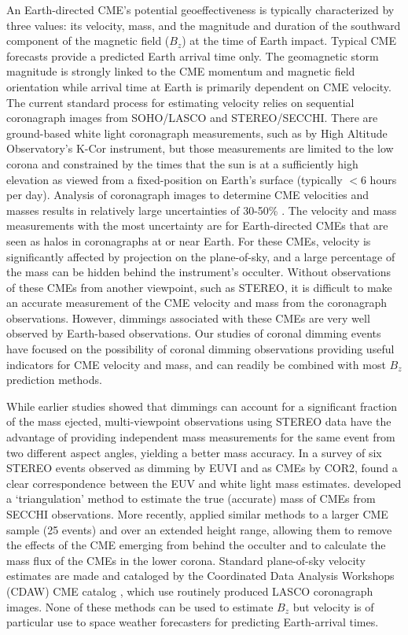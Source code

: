 An Earth-directed CME’s potential geoeffectiveness is typically characterized by three values: its velocity, mass, and the magnitude and duration of the southward component of the magnetic field ($B_z$) at the time of Earth impact. Typical CME forecasts provide a predicted Earth arrival time only. The geomagnetic storm magnitude is strongly linked to the CME momentum and magnetic field orientation while arrival time at Earth is primarily dependent on CME velocity. The current standard process for estimating velocity relies on sequential coronagraph images from SOHO/LASCO and STEREO/SECCHI. There are ground-based white light coronagraph measurements, such as by High Altitude Observatory’s K-Cor instrument, but those measurements are limited to the low corona and constrained by the times that the sun is at a sufficiently high elevation as viewed from a fixed-position on Earth's surface (typically $<$6 hours per day). Analysis of coronagraph images to determine CME velocities and masses results in relatively large uncertainties of 30-50\% \citep{Vourlidas2000, Vourlidas2010, Vourlidas2011}. The velocity and mass measurements with the most uncertainty are for Earth-directed CMEs that are seen as halos in coronagraphs at or near Earth. For these CMEs, velocity is significantly affected by projection on the plane-of-sky, and a large percentage of the mass can be hidden behind the instrument’s occulter. Without observations of these CMEs from another viewpoint, such as STEREO, it is difficult to make an accurate measurement of the CME velocity and mass from the coronagraph observations. However, dimmings associated with these CMEs are very well observed by Earth-based observations. Our studies of coronal dimming events have focused on the possibility of coronal dimming observations providing useful indicators for CME velocity and mass, and can readily be combined with most $B_z$ prediction methods.

While earlier studies showed that dimmings can account for a significant fraction of the mass ejected, multi-viewpoint observations using STEREO data have the advantage of providing independent mass measurements for the same event from two different aspect angles, yielding a better mass accuracy. In a survey of six STEREO events observed as dimming by EUVI and as CMEs by COR2, \citet{Aschwanden2009} found a clear correspondence between the EUV and white light mass estimates. \citet{Colaninno2009} developed a ‘triangulation’ method to estimate the true (accurate) mass of CMEs from SECCHI observations. More recently, \citet{Bein2013} applied similar methods to a larger CME sample (25 events) and over an extended height range, allowing them to remove the effects of the CME emerging from behind the occulter and to calculate the mass flux of the CMEs in the lower corona. Standard plane-of-sky velocity estimates are made and cataloged by the Coordinated Data Analysis Workshops (CDAW) CME catalog \citep{Gopalswamy2009}, which use routinely produced LASCO coronagraph images. None of these methods can be used to estimate $B_z$ but velocity is of particular use to space weather forecasters for predicting Earth-arrival times.

